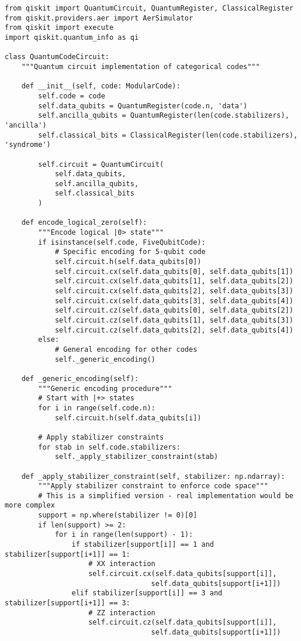 \documentclass[12pt,a4paper]{article}
\begin{document}
\begin{lstlisting}[style=python,caption=Quantum circuit implementations using Qiskit]
from qiskit import QuantumCircuit, QuantumRegister, ClassicalRegister
from qiskit.providers.aer import AerSimulator
from qiskit import execute
import qiskit.quantum_info as qi

class QuantumCodeCircuit:
    """Quantum circuit implementation of categorical codes"""
    
    def __init__(self, code: ModularCode):
        self.code = code
        self.data_qubits = QuantumRegister(code.n, 'data')
        self.ancilla_qubits = QuantumRegister(len(code.stabilizers), 'ancilla')
        self.classical_bits = ClassicalRegister(len(code.stabilizers), 'syndrome')
        
        self.circuit = QuantumCircuit(
            self.data_qubits,
            self.ancilla_qubits,
            self.classical_bits
        )
    
    def encode_logical_zero(self):
        """Encode logical |0> state"""
        if isinstance(self.code, FiveQubitCode):
            # Specific encoding for 5-qubit code
            self.circuit.h(self.data_qubits[0])
            self.circuit.cx(self.data_qubits[0], self.data_qubits[1])
            self.circuit.cx(self.data_qubits[1], self.data_qubits[2])
            self.circuit.cx(self.data_qubits[2], self.data_qubits[3])
            self.circuit.cx(self.data_qubits[3], self.data_qubits[4])
            self.circuit.cz(self.data_qubits[0], self.data_qubits[2])
            self.circuit.cz(self.data_qubits[1], self.data_qubits[3])
            self.circuit.cz(self.data_qubits[2], self.data_qubits[4])
        else:
            # General encoding for other codes
            self._generic_encoding()
    
    def _generic_encoding(self):
        """Generic encoding procedure"""
        # Start with |+> states
        for i in range(self.code.n):
            self.circuit.h(self.data_qubits[i])
        
        # Apply stabilizer constraints
        for stab in self.code.stabilizers:
            self._apply_stabilizer_constraint(stab)
    
    def _apply_stabilizer_constraint(self, stabilizer: np.ndarray):
        """Apply stabilizer constraint to enforce code space"""
        # This is a simplified version - real implementation would be more complex
        support = np.where(stabilizer != 0)[0]
        if len(support) >= 2:
            for i in range(len(support) - 1):
                if stabilizer[support[i]] == 1 and stabilizer[support[i+1]] == 1:
                    # XX interaction
                    self.circuit.cx(self.data_qubits[support[i]], 
                                   self.data_qubits[support[i+1]])
                elif stabilizer[support[i]] == 3 and stabilizer[support[i+1]] == 3:
                    # ZZ interaction
                    self.circuit.cz(self.data_qubits[support[i]], 
                                   self.data_qubits[support[i+1]])
    

\end{lstlisting}
\end{document}
